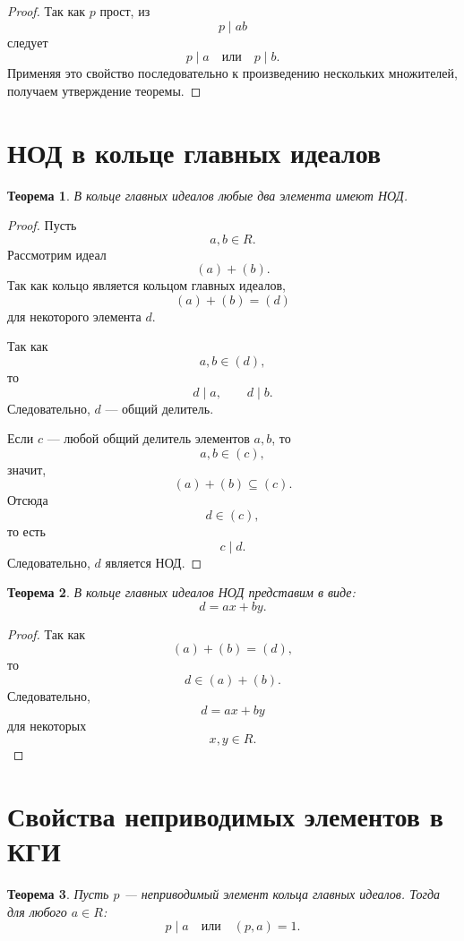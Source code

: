 \documentclass[12pt, a4paper]{article}
\newtheorem{theorem}{Теорема}
\theoremstyle{definition}
\theoremstyle{remark}
\begin{document}
\begin{proof}
	Так как $p$ прост, из
	\[
	p\mid ab
	\]
	следует
	\[
	p\mid a \quad \text{или}\quad p\mid b.
	\]
	Применяя это свойство последовательно к произведению нескольких множителей, получаем утверждение теоремы.
\end{proof}

\section{НОД в кольце главных идеалов}

\begin{theorem}
	В кольце главных идеалов любые два элемента имеют НОД.
\end{theorem}

\begin{proof}
	Пусть
	\[
	a,b\in R.
	\]
	Рассмотрим идеал
	\[
	(a)+(b).
	\]
	Так как кольцо является кольцом главных идеалов,
	\[
	(a)+(b)=(d)
	\]
	для некоторого элемента $d$.
	
	Так как
	\[
	a,b\in(d),
	\]
	то
	\[
	d\mid a,
	\qquad
	d\mid b.
	\]
	Следовательно, $d$ --- общий делитель.
	
	Если $c$ --- любой общий делитель элементов $a,b$, то
	\[
	a,b\in(c),
	\]
	значит,
	\[
	(a)+(b)\subseteq(c).
	\]
	Отсюда
	\[
	d\in(c),
	\]
	то есть
	\[
	c\mid d.
	\]
	Следовательно, $d$ является НОД.
\end{proof}

\begin{theorem}
	В кольце главных идеалов НОД представим в виде:
	\[
	d=ax+by.
	\]
\end{theorem}

\begin{proof}
	Так как
	\[
	(a)+(b)=(d),
	\]
	то
	\[
	d\in(a)+(b).
	\]
	Следовательно,
	\[
	d=ax+by
	\]
	для некоторых
	\[
	x,y\in R.
	\]
\end{proof}

\section{Свойства неприводимых элементов в КГИ}

\begin{theorem}
	Пусть $p$ --- неприводимый элемент кольца главных идеалов. Тогда для любого
	$a\in R$:
	\[
	p\mid a
	\quad \text{или}\quad
	(p,a)=1.
	\]
\end{theorem}
\end{document}
